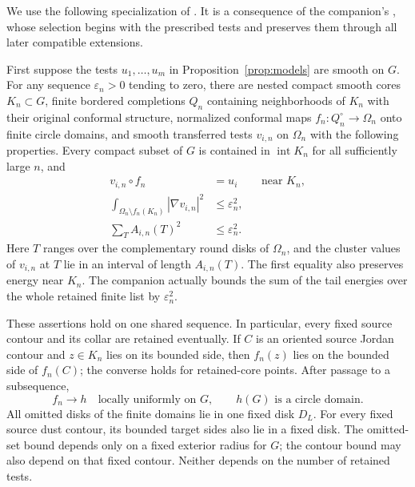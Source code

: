 We use the following specialization of
\cite[]{KoebeCompanion}.
It is a consequence of the companion's
, whose selection begins
with the prescribed tests and preserves them through all later compatible
extensions.

First suppose the tests $u_1,\ldots,u_m$ in
Proposition~\ref{prop:models} are smooth on $G$.  For any sequence
$\varepsilon_n>0$ tending to zero, there are nested compact smooth cores
$K_n\subset G$, finite bordered completions $Q_n$ containing
neighborhoods of $K_n$ with their original conformal structure, normalized conformal
maps $f_n:Q_n^\circ\to\Omega_n$ onto finite circle domains, and smooth
transferred tests $v_{i,n}$ on $\Omega_n$ with the following properties.
Every compact subset of $G$ is contained in $\operatorname{int}K_n$ for
all sufficiently large $n$, and
\begin{align}
 v_{i,n}\circ f_n&=u_i
       &&\text{near }K_n,\label{eq:model-core}\\
 \int_{\Omega_n\setminus f_n(K_n)}|\nabla v_{i,n}|^2
       &\le\varepsilon_n^2,\label{eq:model-tail}\\
 \sum_T A_{i,n}(T)^2&\le\varepsilon_n^2.
       \label{eq:model-osc}
\end{align}
Here $T$ ranges over the complementary round disks of $\Omega_n$, and
the cluster values of $v_{i,n}$ at $T$ lie in an interval of length
$A_{i,n}(T)$.  The first equality also preserves energy near $K_n$.  The
companion actually bounds the sum of the tail energies over the whole
retained finite list by $\varepsilon_n^2$.

These assertions hold on one shared sequence.  In particular, every
fixed source contour and its collar are retained eventually.  If $C$
is an oriented source Jordan contour and $z\in K_n$ lies on its
bounded side, then $f_n(z)$ lies on the bounded side of $f_n(C)$;
the converse holds for retained-core points.  After passage to a
subsequence,
\begin{equation}\label{eq:model-map-limit}
 f_n\longrightarrow h\quad\text{locally uniformly on }G,
 \qquad h(G)\text{ is a circle domain}.
\end{equation}
All omitted disks of the finite domains lie in one fixed disk $D_L$.
For every fixed source dust contour, its bounded target sides also
lie in a fixed disk.  The omitted-set bound depends only on a fixed
exterior radius for $G$; the contour bound may also depend on that
fixed contour.  Neither depends on the number of retained tests.

